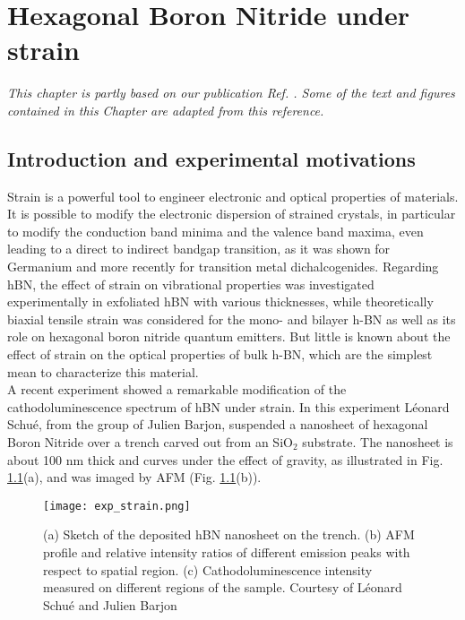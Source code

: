 \chapter{Hexagonal Boron Nitride under strain} \label{chap:strain}
\textit{This chapter is partly based on our publication Ref. \cite{lechifflart2022excitons}. Some of the text and figures contained in this Chapter are adapted from this reference.}

\chaptertoc{}

%
\section{Introduction and experimental motivations}
Strain is a powerful tool to engineer electronic and optical properties of materials. It is possible to modify the electronic dispersion of strained crystals, in particular to modify the conduction band minima and the valence band maxima, even leading to a direct to indirect bandgap transition, as it was shown for Germanium \cite{hoshina2009first,cheng2010strain} and more recently for transition metal dichalcogenides.\cite{desai2014strain,choudhary2020shear,frisenda2017biaxial} Regarding hBN, the effect of strain on vibrational properties was investigated experimentally in exfoliated hBN with various thicknesses,\cite{androulidakis2018strained} while theoretically biaxial tensile strain was considered for the mono- and bilayer h-BN \cite{yang2013distorted,fujimoto2016band} as well as its role on hexagonal boron nitride quantum emitters.\cite{tabesh2021strain} But little is known about the effect of strain on the optical properties of bulk h-BN, which are the simplest mean to characterize this material. \\
A recent experiment showed a remarkable modification of the cathodoluminescence spectrum of hBN under strain. \cite{schue2017proprietes} In this experiment Léonard Schué, from the group of Julien Barjon, suspended a nanosheet of hexagonal Boron Nitride over a trench carved out from an SiO$_2$ substrate. The nanosheet is about 100 nm thick and curves under the effect of gravity, as illustrated in Fig. \ref{fig:exp_strain}(a), and was imaged by \acrfull{AFM} (Fig. \ref{fig:exp_strain}(b)).
\begin{figure}[tbp]
	\vspace{0.2cm}
	\setcapindent{2em}
	\centering
	\texttt{[image: exp\_strain.png]}
	\caption{(a) Sketch of the deposited hBN nanosheet on the trench. (b) AFM profile and relative intensity ratios of different emission peaks with respect to spatial region. (c) Cathodoluminescence intensity measured on different regions of the sample. \footnotesize{Courtesy of Léonard Schué and Julien Barjon}}
	\label{fig:exp_strain}
\end{figure}
